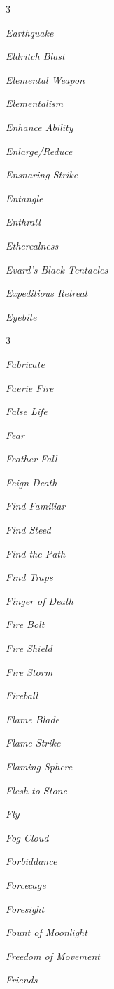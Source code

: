 \documentclass[10pt,a4paper,twoside,bg=print,twocolumn,openany,nodeprecatedcode]{dndbook}
\begin{document}
\begin{description}
\begin{multicols}{3}
\item \textit{Earthquake}
\item \textit{Eldritch Blast}
\item \textit{Elemental Weapon}
\item \textit{Elementalism}
\item \textit{Enhance Ability}
\item \textit{Enlarge/Reduce}
\item \textit{Ensnaring Strike}
\item \textit{Entangle}
\item \textit{Enthrall}
\item \textit{Etherealness}
\item \textit{Evard's Black Tentacles}
\item \textit{Expeditious Retreat}
\item \textit{Eyebite}
\end{multicols}

\end{description}


\begin{description}
\begin{multicols}{3}
\item \textit{Fabricate}
\item \textit{Faerie Fire}
\item \textit{False Life}
\item \textit{Fear}
\item \textit{Feather Fall}
\item \textit{Feign Death}
\item \textit{Find Familiar}
\item \textit{Find Steed}
\item \textit{Find the Path}
\item \textit{Find Traps}
\item \textit{Finger of Death}
\item \textit{Fire Bolt}
\item \textit{Fire Shield}
\item \textit{Fire Storm}
\item \textit{Fireball}
\item \textit{Flame Blade}
\item \textit{Flame Strike}
\item \textit{Flaming Sphere}
\item \textit{Flesh to Stone}
\item \textit{Fly}
\item \textit{Fog Cloud}
\item \textit{Forbiddance}
\item \textit{Forcecage}
\item \textit{Foresight}
\item \textit{Fount of Moonlight}
\item \textit{Freedom of Movement}
\item \textit{Friends}
\end{multicols}

\end{description}
\end{document}
